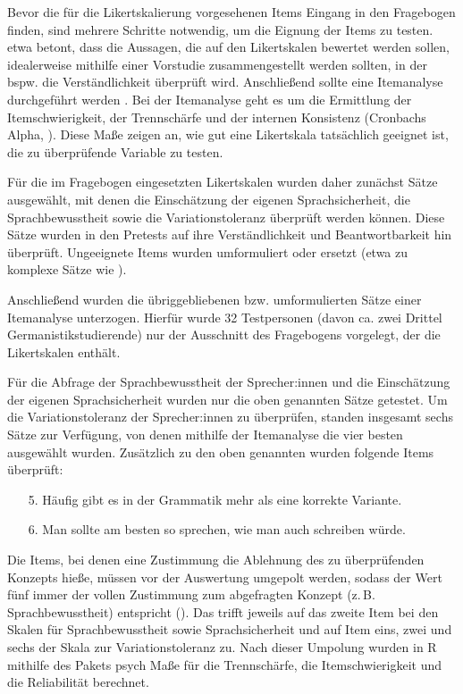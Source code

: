 Bevor die für die Likertskalierung vorgesehenen Items Eingang in den Fragebogen finden, sind mehrere Schritte notwendig, um die Eignung der Items zu {tes\-ten}. \citet[1255]{Garrett2005} etwa betont, dass die Aussagen, die auf den Likertskalen bewertet werden sollen, idealerweise mithilfe einer Vorstudie zusammengestellt werden sollten, in der bspw. die Verständlichkeit überprüft wird. Anschließend sollte eine Itemanalyse durchgeführt werden \citep[s.][289]{Doring2016}. Bei der Itemanalyse geht es um die Ermittlung der Itemschwierigkeit, der Trennschärfe und der internen Konsistenz (Cronbachs Alpha, \citealp[s.][289]{Doring2016}). Diese Maße zeigen an, wie gut eine Likertskala tatsächlich geeignet ist, die zu überprüfende Variable zu testen.

Für die im Fragebogen eingesetzten Likertskalen wurden daher zunächst Sätze ausgewählt, mit denen die Einschätzung der eigenen Sprachsicherheit, die Sprachbewusstheit sowie die Variationstoleranz überprüft werden können. 
Diese Sätze wurden in den Pretests auf ihre Verständlichkeit und Beantwortbarkeit hin überprüft. 
Ungeeignete Items wurden umformuliert oder ersetzt (etwa zu komplexe Sätze wie ).
 
Anschließend wurden die übriggebliebenen bzw. umformulierten Sätze einer Itemanalyse unterzogen. 
Hierfür wurde 32 Testpersonen (davon ca. zwei Drittel Germanistikstudierende) nur der Ausschnitt des Fragebogens vorgelegt, der die Likertskalen enthält. 

Für die Abfrage der Sprachbewusstheit der Sprecher:innen und die Einschätzung der eigenen Sprachsicherheit wurden nur die oben genannten Sätze getestet. 
Um die Variationstoleranz der Sprecher:innen zu überprüfen, standen insgesamt sechs Sätze zur Verfügung, von denen mithilfe der Itemanalyse die vier besten ausgewählt wurden. 
Zusätzlich zu den oben genannten wurden folgende Items überprüft: 
\begin{enumerate}
\item[5.] Häufig gibt es in der Grammatik mehr als eine korrekte Variante.  
\item[6.] Man sollte am besten so sprechen, wie man auch schreiben würde. 
\end{enumerate}
Die Items, bei denen eine Zustimmung die Ablehnung des zu überprüfenden Konzepts hieße, müssen vor der Auswertung umgepolt werden, sodass der Wert fünf immer der vollen Zustimmung zum abgefragten Konzept (z.\,B. Sprachbewusstheit) entspricht (\cites[s.][242]{Diekmann2008}[75]{Rasinger2010}). 
Das trifft jeweils auf das zweite Item bei den Skalen für Sprachbewusstheit sowie Sprachsicherheit und auf Item eins, zwei und sechs der Skala zur Variationstoleranz zu. 
Nach dieser Umpolung wurden in R \citep[][Version 3.6.1]{RCoreTeam2019} mithilfe des Pakets psych \citep[][Version 2.0.7]{Revelle2016} Maße für die Trennschärfe, die Itemschwierigkeit und die Reliabilität berechnet.

